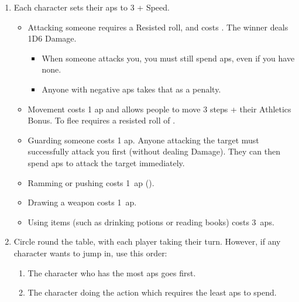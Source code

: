 \begin{enumerate}
  \item
  Each character sets their \glspl{ap} to 3 + Speed.
  \begin{itemize}
    \item
    Attacking someone requires a Resisted  roll, and costs .
    The winner deals 1D6 Damage.
    \begin{itemize}
      \item
      When someone attacks you, you must still spend \glspl{ap}, even if you have none.
      \item
      Anyone with negative \glspl{ap} takes that as a penalty.
    \end{itemize}
    \item
    Movement costs 1 \gls{ap} and allows people to move 3 \glspl{step} + their Athletics Bonus.
    To flee requires a resisted roll of .
    \item
    Guarding someone costs 1 \gls{ap}.
    Anyone attacking the target must successfully attack you first (without dealing Damage).
    They can then spend \glspl{ap} to attack the target immediately.
    \item
    Ramming or pushing costs 1~\gls{ap} ().
    \item
    Drawing a weapon costs 1~\gls{ap}.
    \item
    Using items (such as drinking potions or reading books) costs 3~\glspl{ap}.
  \end{itemize}
  \item
  Circle round the table, with each player taking their turn.
  However, if any character wants to jump in, use this order:
  \begin{enumerate}
    \item
    The character who has the most \glspl{ap} goes first.
    \item
    The character doing the action which requires the least \glspl{ap} to spend.
  \end{enumerate}
\end{enumerate}

